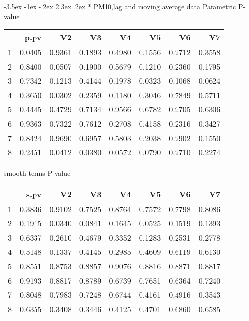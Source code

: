 \documentclass[a4paper, 12pt]{article}
\makeatletter
\def\Large{\fontsize{16}{24}\selectfont}
\renewcommand\section{\@startsection {section}{1}{\z@}%
                                   {-3.5ex \@plus -1ex \@minus -.2ex}%
                                   {2.3ex \@plus.2ex}%
                                   {\centering\normalfont\Large\bfseries}}
\makeatother
\begin{document}
\section*{ PM10,lag and moving average data}
Parametric P-value
\begin{table}[ht]
\centering
\begin{tabular}{rrrrrrrr}
  \hline
 & p.pv & V2 & V3 & V4 & V5 & V6 & V7 \\
  \hline
1 & 0.0405 & 0.9361 & 0.1893 & 0.4980 & 0.1556 & 0.2712 & 0.3558 \\
  2 & 0.8400 & 0.0507 & 0.1900 & 0.5679 & 0.1210 & 0.2360 & 0.1795 \\
  3 & 0.7342 & 0.1213 & 0.4144 & 0.1978 & 0.0323 & 0.1068 & 0.0624 \\
  4 & 0.3650 & 0.0302 & 0.2359 & 0.1180 & 0.3046 & 0.7849 & 0.5711 \\
  5 & 0.4445 & 0.4729 & 0.7134 & 0.9566 & 0.6782 & 0.9705 & 0.6306 \\
  6 & 0.9363 & 0.7322 & 0.7612 & 0.2708 & 0.4158 & 0.2316 & 0.3427 \\
  7 & 0.8424 & 0.9690 & 0.6957 & 0.5803 & 0.2038 & 0.2902 & 0.1550 \\
  8 & 0.2451 & 0.0412 & 0.0380 & 0.0572 & 0.0790 & 0.2710 & 0.2274 \\
   \hline
\end{tabular}
\end{table}

smooth terms P-value
\begin{table}[ht]
\centering
\begin{tabular}{rrrrrrrr}
  \hline
 & s.pv & V2 & V3 & V4 & V5 & V6 & V7 \\
  \hline
1 & 0.3836 & 0.9102 & 0.7525 & 0.8764 & 0.7572 & 0.7798 & 0.8086 \\
  2 & 0.1915 & 0.0340 & 0.0841 & 0.1645 & 0.0525 & 0.1519 & 0.1393 \\
  3 & 0.6337 & 0.2610 & 0.4679 & 0.3352 & 0.1283 & 0.2531 & 0.2778 \\
  4 & 0.5148 & 0.1337 & 0.4145 & 0.2985 & 0.4609 & 0.6119 & 0.6130 \\
  5 & 0.8551 & 0.8753 & 0.8857 & 0.9076 & 0.8816 & 0.8871 & 0.8817 \\
  6 & 0.9193 & 0.8817 & 0.8789 & 0.6739 & 0.7651 & 0.6364 & 0.7240 \\
  7 & 0.8048 & 0.7983 & 0.7248 & 0.6744 & 0.4161 & 0.4916 & 0.3543 \\
  8 & 0.6355 & 0.3408 & 0.3446 & 0.4125 & 0.4701 & 0.6860 & 0.6585 \\
   \hline
\end{tabular}
\end{table}
\clearpage
\end{document}
